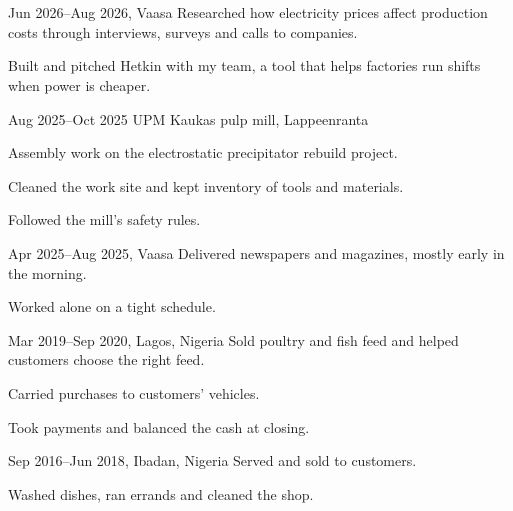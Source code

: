 \documentclass[a4paper,11pt]{article}
\begin{document}
\section{}
\begin{cventry}{Jun 2026--Aug 2026}{, Vaasa}
  Researched how electricity prices affect production costs through interviews, surveys and calls to companies.\par
  Built and pitched Hetkin with my team, a tool that helps factories run shifts when power is cheaper.
\end{cventry}
\begin{cventry}{Aug 2025--Oct 2025}{}
  UPM Kaukas pulp mill, Lappeenranta\par
  Assembly work on the electrostatic precipitator rebuild project.\par
  Cleaned the work site and kept inventory of tools and materials.\par
  Followed the mill's safety rules.
\end{cventry}
\begin{cventry}{Apr 2025--Aug 2025}{, Vaasa}
  Delivered newspapers and magazines, mostly early in the morning.\par
  Worked alone on a tight schedule.
\end{cventry}
\begin{cventry}{Mar 2019--Sep 2020}{, Lagos, Nigeria}
  Sold poultry and fish feed and helped customers choose the right feed.\par
  Carried purchases to customers' vehicles.\par
  Took payments and balanced the cash at closing.
\end{cventry}
\begin{cventry}{Sep 2016--Jun 2018}{, Ibadan, Nigeria}
  Served and sold to customers.\par
  Washed dishes, ran errands and cleaned the shop.
\end{cventry}
\end{document}
